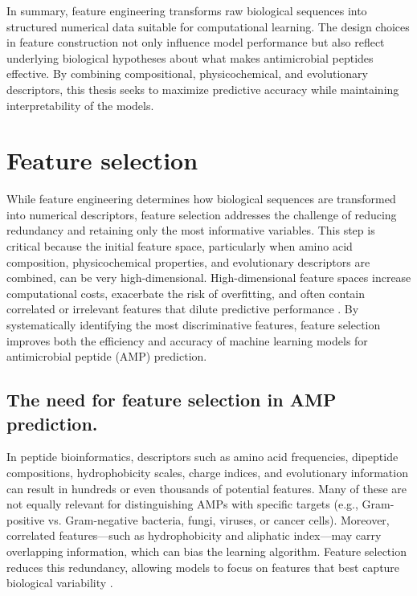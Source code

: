 \documentclass[a4paper,twoside,12pt]{book}
\begin{document}
In summary, feature engineering transforms raw biological sequences into structured numerical data suitable for computational learning. The design choices in feature construction not only influence model performance but also reflect underlying biological hypotheses about what makes antimicrobial peptides effective. By combining compositional, physicochemical, and evolutionary descriptors, this thesis seeks to maximize predictive accuracy while maintaining interpretability of the models.

\section{Feature selection}

While feature engineering determines how biological sequences are transformed into numerical descriptors, feature selection addresses the challenge of reducing redundancy and retaining only the most informative variables. This step is critical because the initial feature space, particularly when amino acid composition, physicochemical properties, and evolutionary descriptors are combined, can be very high-dimensional. High-dimensional feature spaces increase computational costs, exacerbate the risk of overfitting, and often contain correlated or irrelevant features that dilute predictive performance \cite{bib:li2022}. By systematically identifying the most discriminative features, feature selection improves both the efficiency and accuracy of machine learning models for antimicrobial peptide (AMP) prediction.

\subsection{The need for feature selection in AMP prediction.}
In peptide bioinformatics, descriptors such as amino acid frequencies, dipeptide compositions, hydrophobicity scales, charge indices, and evolutionary information can result in hundreds or even thousands of potential features. Many of these are not equally relevant for distinguishing AMPs with specific targets (e.g., Gram-positive vs. Gram-negative bacteria, fungi, viruses, or cancer cells). Moreover, correlated features—such as hydrophobicity and aliphatic index—may carry overlapping information, which can bias the learning algorithm. Feature selection reduces this redundancy, allowing models to focus on features that best capture biological variability \cite{bib:fjell2011}.
\end{document}
